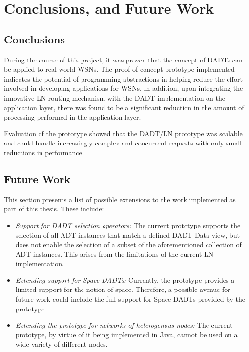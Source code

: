 \chapter{Conclusions, and Future Work} \label{chap:conclusions}
 \section{Conclusions}

During the course of this project, it was proven that the concept of DADTs can be
applied to real world WSNs. The proof-of-concept prototype implemented indicates
the potential of programming abstractions in helping reduce the effort involved
in developing applications for WSNs.
In addition, upon integrating the innovative LN routing mechanism
with the DADT implementation on the application layer, there was found to be a
significant reduction in the amount of processing performed in the application
layer. 

Evaluation of the prototype showed that the DADT/LN prototype was scalable and
could handle increasingly complex and concurrent requests with only small
reductions in performance.
 
\section{Future Work}

This section presents a list of possible extensions to the work implemented as
part of this thesis. These include:

\begin{itemize}
  \item \emph{Support for DADT selection operators:} The current prototype
  supports the selection of all ADT instances that match a defined DADT Data
  view, but does not enable the selection of a subset of the aforementioned
  collection of ADT instances. This arises from the limitations of the current
  LN implementation.
  \item \emph{Extending support for Space DADTs:} Currently, the prototype
  provides a limited support for the notion of space. Therefore, a possible
  avenue for future work could include the full support for Space DADTs
  provided by the prototype.
  \item \emph{Extending the prototype for networks of heterogenous nodes:}
  The current prototype, by virtue of it being implemented in Java, cannot be
  used on a wide variety of different nodes. 
\end{itemize}
